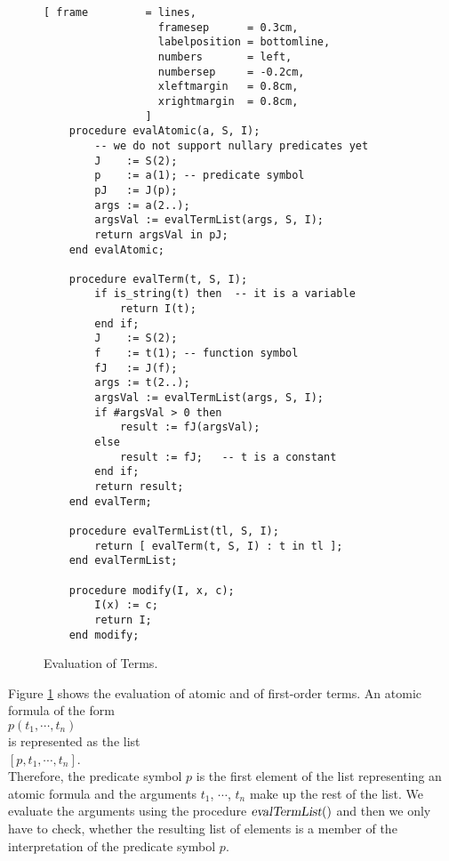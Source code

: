 \begin{figure}[!ht]
\centering
\begin{Verbatim}[ frame         = lines, 
                  framesep      = 0.3cm, 
                  labelposition = bottomline,
                  numbers       = left,
                  numbersep     = -0.2cm,
                  xleftmargin   = 0.8cm,
                  xrightmargin  = 0.8cm,
                ]
    procedure evalAtomic(a, S, I);
        -- we do not support nullary predicates yet
        J    := S(2);
        p    := a(1); -- predicate symbol
        pJ   := J(p);
        args := a(2..);
        argsVal := evalTermList(args, S, I);
        return argsVal in pJ;
    end evalAtomic;  

    procedure evalTerm(t, S, I);
        if is_string(t) then  -- it is a variable
            return I(t);
        end if;
        J    := S(2);
        f    := t(1); -- function symbol
        fJ   := J(f);
        args := t(2..);
        argsVal := evalTermList(args, S, I);
        if #argsVal > 0 then
            result := fJ(argsVal); 
        else
            result := fJ;   -- t is a constant
        end if;
        return result;
    end evalTerm;

    procedure evalTermList(tl, S, I);
        return [ evalTerm(t, S, I) : t in tl ];
    end evalTermList;

    procedure modify(I, x, c);
        I(x) := c; 
        return I;
    end modify;
\end{Verbatim}
\vspace*{-0.3cm}
\caption{Evaluation of Terms.}
\label{fig:pl-evaluate-term.stl}
\end{figure}

Figure \ref{fig:pl-evaluate-term.stl} shows the evaluation of atomic \formulae and of
first-order terms.  An atomic formula of the form
\\[0.2cm]
\hspace*{1.3cm}
$p(t_1, \cdots, t_n)$
\\[0.2cm]
is represented as the list
\\[0.2cm]
\hspace*{1.3cm}
$[ p, t_1, \cdots, t_n ]$.
\\[0.2cm]
Therefore, the predicate symbol $p$ is the first element of the list representing an
atomic formula and the arguments $t_1$, $\cdots$, $t_n$ make up the rest of the list.
We evaluate the arguments using the procedure $\textsl{evalTermList}()$ and then we only
have to check, whether the resulting list of elements is a member of the interpretation of
the predicate symbol $p$.

